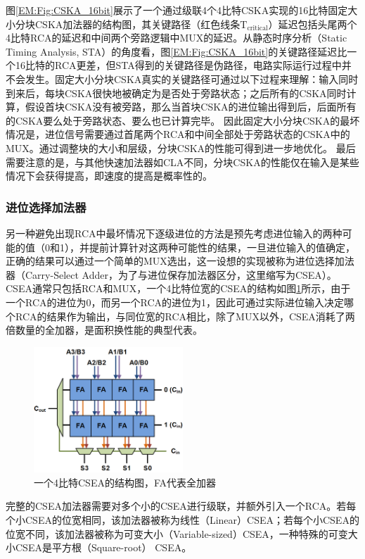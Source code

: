 图\ref{EM:Fig:CSKA_16bit}展示了一个通过级联4个4比特CSKA实现的16比特固定大小分块CSKA加法器的结构图，其关键路径（红色线条$\text{T}_{\text{critical}}$）延迟包括头尾两个4比特RCA的延迟和中间两个旁路逻辑中MUX的延迟。从静态时序分析（Static Timing Analysis, STA）的角度看，图\ref{EM:Fig:CSKA_16bit}的关键路径延迟比一个16比特的RCA更差，但STA得到的关键路径是伪路径，电路实际运行过程中并不会发生。固定大小分块CSKA真实的关键路径可通过以下过程来理解：输入同时到来后，每块CSKA很快地被确定为是否处于旁路状态；之后所有的CSKA同时计算，假设首块CSKA没有被旁路，那么当首块CSKA的进位输出得到后，后面所有的CSKA要么处于旁路状态、要么也已计算完毕。
因此固定大小分块CSKA的最坏情况是，进位信号需要通过首尾两个RCA和中间全部处于旁路状态的CSKA中的MUX。通过调整块的大小和层级，分块CSKA的性能可得到进一步地优化。
最后需要注意的是，与其他快速加法器如CLA不同，分块CSKA的性能仅在输入是某些情况下会获得提高，即速度的提高是概率性的。

\subsubsection{进位选择加法器}

另一种避免出现RCA中最坏情况下逐级进位的方法是预先考虑进位输入的两种可能的值（0和1），并提前计算针对这两种可能性的结果，一旦进位输入的值确定，正确的结果可以通过一个简单的MUX选出，这一设想的实现被称为进位选择加法器（Carry-Select Adder，为了与进位保存加法器区分，这里缩写为CSEA）。CSEA通常只包括RCA和MUX，一个4比特位宽的CSEA的结构如图\ref{EM:Fig:CSEA_basic}所示，由于一个RCA的进位为0，而另一个RCA的进位为1，因此可通过实际进位输入决定哪个RCA的结果作为输出，与同位宽的RCA相比，除了MUX以外，CSEA消耗了两倍数量的全加器，是面积换性能的典型代表。
\begin{figure}[!htb]
    \centering
    \includegraphics[width=0.5\textwidth]{figs/EM-CSEA_basic.png}
    \caption{一个4比特CSEA的结构图，FA代表全加器}
\label{EM:Fig:CSEA_basic}
\end{figure}

完整的CSEA加法器需要对多个小的CSEA进行级联，并额外引入一个RCA。若每个小CSEA的位宽相同，该加法器被称为线性（Linear）CSEA；若每个小CSEA的位宽不同，该加法器被称为可变大小（Variable-sized）CSEA，一种特殊的可变大小CSEA是平方根（Square-root） CSEA。

